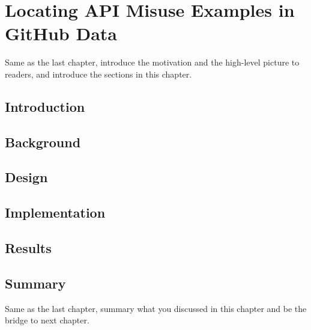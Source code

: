 \chapter{Locating API Misuse Examples in GitHub Data}
\label{cha:infoRetrieval}
Same as the last chapter, introduce the motivation and the high-level picture to
readers, and introduce the sections in this chapter.

\section{Introduction}

\section{Background}

\section{Design}

\section{Implementation}

\section{Results}

\section{Summary}
Same as the last chapter, summary what you discussed in this chapter and
be the bridge to next chapter.
